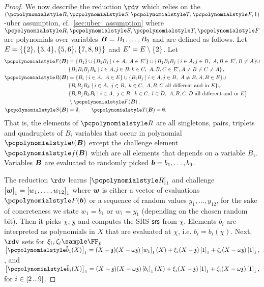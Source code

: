 \documentclass[runningheads,11pt]{llncs}
\let\spvec\vec
\let\vec\accentvec
\let\spvec\vec
\let\vec\spvec
\def\vec#1{\mathchoice{\mbox{\boldmath$\displaystyle#1$}}
  {\mbox{\boldmath$\textstyle#1$}} {\mbox{\boldmath$\scriptstyle#1$}}
  {\mbox{\boldmath$\scriptscriptstyle#1$}}}
\begin{document}
\begin{proof}
 We now describe the reduction $\rdv$ which
relies on the $(\pR, \pS, \pT, \pF, 1)$-uber assumption, cf.~\cref{sec:uber_assumption}
where $\pR, \pS, \pT, \pF$ are polynomials over variables
$\vB = B_1, \ldots, B_9$ and are defined as follows. Let
$E = \{\{2\}, \{3, 4\}, \{5, 6\}, \{7, 8,
    9\}\}$ and $E' = E \setminus \{2\}$. Let
\begin{align}
\label{eq:uber}
\pF(\vB) & = \smallset{B_1} \cup \smallset{B_1B_i \mid i \in A,\ A \in E'} \cup
             \smallset{B_1B_iB_j \mid i \in A, j \in B,\ A, B \in E', B
             \neq A} \cup \notag\\
           & \smallset{B_1B_iB_jB_k \mid i \in A, j \in
             B, k \in C,\ A, B, C \in E', A \neq B \neq C \neq A}\notag\,,\\
  \pR(\vB) & = \smallset{B_i \mid i \in A,\ A \in E} \cup \smallset{B_i B_j \mid i \in
             A, j \in B,\ A \neq B, A, B \in E} \cup \\ 
           & \smallset{B_i B_j B_k \mid i \in A,\ j \in
             B,\ k \in C,\
             A, B, C \text{ all different and in } E} \cup \notag \\
           & \smallset{B_i B_j B_k B_l \mid i \in A,\ j \in B,\ k \in C,\ l \in D,\
             A, B, C, D \text{ all different and in } E} \notag \\
           & \setminus \pF(\vB)\,,\notag \\
  \pS(\vB) & = \emptyset, \qquad \pT(\vB) = \emptyset.
\end{align}
That is, the elements of $\pR$ are all singletons, pairs, triplets and
quadruplets of $B_i$ variables that occur in polynomial $\pt(\vB)$ except the
challenge element $\pf(\vB)$ which are all elements that depends on a variable
$B_1$. Variables $\vB$ are evaluated to randomly picked
$\vb = b_1, \ldots, b_9$.

The reduction $\rdv$ learns $\gone{\pR}$ and challenge
$\gone{\vec{w}} = \gone{w_1, \ldots, w_{12}}$ where $\vec{w}$ is either a vector
of evaluations $\pF(\vb)$ or a sequence of random values $y_1, \ldots, y_{12}$,
for the sake of concreteness we state $w_1 = b_1$ or $w_1 = y_1$ (depending on
the chosen random bit). Then it picks $\chi$, $\mathfrak{z}$ and computes the SRS $\mathsf{srs}$
from $\chi$. Elements $b_i$ are interpreted as polynomials in $X$ that are
evaluated at $\chi$, i.e. $b_i = b_i(\chi)$. Next, $\rdv$ sets for
$\xi_i, \zeta_i \sample \FF_p$
\(
  \gone{\p{\tb}_1(X)} =
(X - \chz)(X - \ochz) \gone{w_1}(X) + \xi_i (X - \chz) \gone{1} +
\zeta_i (X - \ochz) \gone{1}, %
\),
and
\(
  \gone{\p{\tb}_i(X)} =
(X - \chz)(X - \ochz) \gone{b_i}(X) + \xi_i (X - \chz) \gone{1} +
\zeta_i (X - \ochz) \gone{1}, %
\) 
for $i \in [2 \, .. \, 9]$.


\end{proof}
\end{document}
